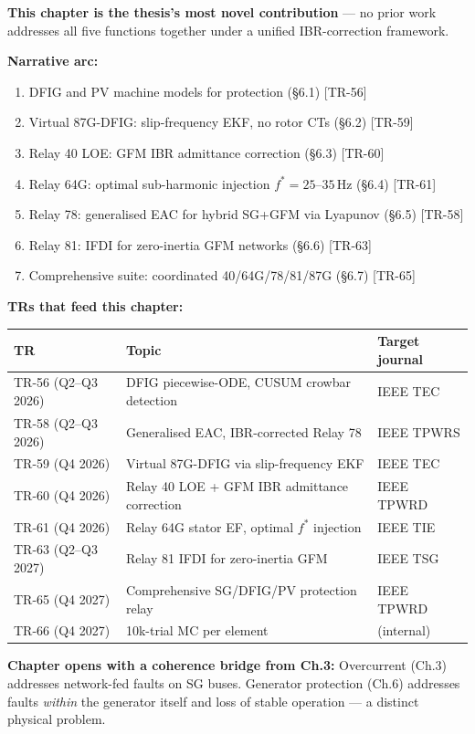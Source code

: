 \documentclass[11pt, a4paper]{article}
\begin{document}
\textbf{This chapter is the thesis's most novel contribution} — no prior work
addresses all five functions together under a unified IBR-correction framework.

\textbf{Narrative arc:}
\begin{enumerate}[nosep]
  \item DFIG and PV machine models for protection (§6.1) [TR-56]
  \item Virtual 87G-DFIG: slip-frequency EKF, no rotor CTs (§6.2) [TR-59]
  \item Relay 40 LOE: GFM IBR admittance correction (§6.3) [TR-60]
  \item Relay 64G: optimal sub-harmonic injection $f^*=25$--$35\,\text{Hz}$ (§6.4) [TR-61]
  \item Relay 78: generalised EAC for hybrid SG+GFM via Lyapunov (§6.5) [TR-58]
  \item Relay 81: IFDI for zero-inertia GFM networks (§6.6) [TR-63]
  \item Comprehensive suite: coordinated 40/64G/78/81/87G (§6.7) [TR-65]
\end{enumerate}

\textbf{TRs that feed this chapter:}
\begin{center}
\begin{tabular}{lll}
\toprule
TR & Topic & Target journal \\
\midrule
TR-56 (Q2--Q3 2026) & DFIG piecewise-ODE, CUSUM crowbar detection & IEEE TEC \\
TR-58 (Q2--Q3 2026) & Generalised EAC, IBR-corrected Relay 78 & IEEE TPWRS \\
TR-59 (Q4 2026) & Virtual 87G-DFIG via slip-frequency EKF & IEEE TEC \\
TR-60 (Q4 2026) & Relay 40 LOE + GFM IBR admittance correction & IEEE TPWRD \\
TR-61 (Q4 2026) & Relay 64G stator EF, optimal $f^*$ injection & IEEE TIE \\
TR-63 (Q2--Q3 2027) & Relay 81 IFDI for zero-inertia GFM & IEEE TSG \\
TR-65 (Q4 2027) & Comprehensive SG/DFIG/PV protection relay & IEEE TPWRD \\
TR-66 (Q4 2027) & 10k-trial MC per element & (internal) \\
\bottomrule
\end{tabular}
\end{center}

\textbf{Chapter opens with a coherence bridge from Ch.3:}
Overcurrent (Ch.3) addresses network-fed faults on SG buses.
Generator protection (Ch.6) addresses faults \emph{within} the generator itself
and loss of stable operation — a distinct physical problem.
\end{document}
